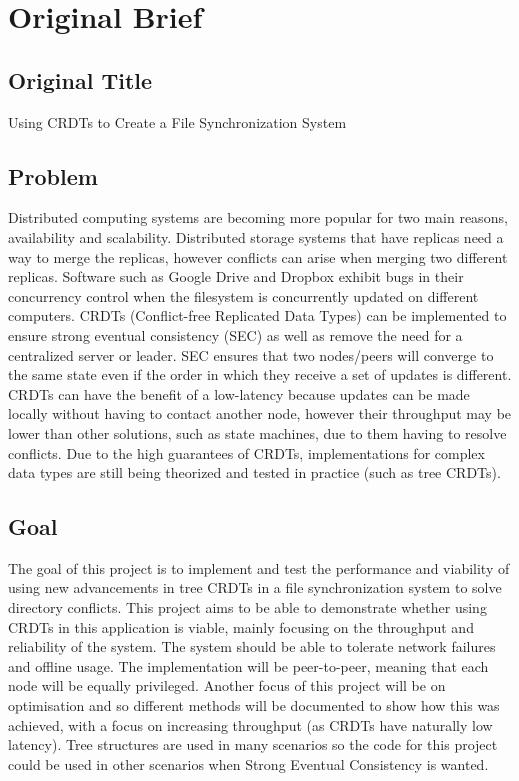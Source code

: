 \documentclass[12pt]{report}
\begin{document}
\chapter{Original Brief}
\section{Original Title}
\begin{center}
Using CRDTs to Create a File Synchronization System
\end{center}

\section{Problem}
Distributed computing systems are becoming more popular for two main reasons, availability
and scalability. Distributed storage systems that have replicas need a way to merge the replicas,
however conflicts can arise when merging two different replicas. Software such as Google Drive
and Dropbox exhibit bugs in their concurrency control when the filesystem is concurrently
updated on different computers. CRDTs (Conflict-free Replicated Data Types) can be
implemented to ensure strong eventual consistency (SEC) as well as remove the need for a
centralized server or leader. SEC ensures that two nodes/peers will converge to the same state
even if the order in which they receive a set of updates is different. CRDTs can have the benefit
of a low-latency because updates can be made locally without having to contact another node,
however their throughput may be lower than other solutions, such as state machines, due to
them having to resolve conflicts. Due to the high guarantees of CRDTs, implementations for
complex data types are still being theorized and tested in practice (such as tree CRDTs).

\section{Goal} 
The goal of this project is to implement and test the performance and viability of using new
advancements in tree CRDTs in a file synchronization system to solve directory conflicts. This
project aims to be able to demonstrate whether using CRDTs in this application is viable, mainly
focusing on the throughput and reliability of the system. The system should be able to tolerate
network failures and offline usage. The implementation will be peer-to-peer, meaning that each
node will be equally privileged. Another focus of this project will be on optimisation and so
different methods will be documented to show how this was achieved, with a focus on
increasing throughput (as CRDTs have naturally low latency).
Tree structures are used in many scenarios so the code for this project could be used in other
scenarios when Strong Eventual Consistency is wanted.
\end{document}
